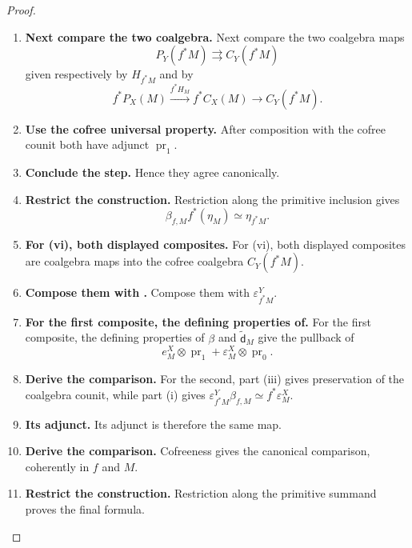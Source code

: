 \begin{proof}
\begin{enumerate}[label=\textup{(\arabic*)}]
    \item \textbf{Next compare the two coalgebra.}
    Next compare the two coalgebra maps
    \[
        P_Y(f^*M)\rightrightarrows C_Y(f^*M)
    \]
    given respectively by \(H_{f^*M}\) and by
    \[
        f^*P_X(M)\xrightarrow{f^*H_M}f^*C_X(M)
        \longrightarrow C_Y(f^*M).
    \]

    \item \textbf{Use the cofree universal property.}
    After composition with the cofree counit both have adjunct \(\operatorname{pr}_1\).

    \item \textbf{Conclude the step.}
    Hence they agree canonically.

    \item \textbf{Restrict the construction.}
    Restriction along the primitive inclusion gives
    \[
        \beta_{f,M}f^*(\eta_M)\simeq\eta_{f^*M}.
    \]

    \item \textbf{For (vi), both displayed composites.}
    For \textup{(vi)}, both displayed composites are coalgebra maps into the cofree coalgebra
    \(C_Y(f^*M)\).

    \item \textbf{Compose them with .}
    Compose them with \(\varepsilon^Y_{f^*M}\).

    \item \textbf{For the first composite, the defining properties of.}
    For the first composite, the defining properties of \(\beta\) and \(\widetilde{\mathsf d}_M\) give the
    pullback of
    \[
        e^X_M\otimes\operatorname{pr}_1+\varepsilon^X_M\otimes\operatorname{pr}_0.
    \]

    \item \textbf{Derive the comparison.}
    For the second, part \textup{(iii)} gives preservation of the coalgebra counit, while part
    \textup{(i)} gives \(\varepsilon^Y_{f^*M}\beta_{f,M}\simeq f^*\varepsilon^X_M\).

    \item \textbf{Its adjunct.}
    Its adjunct is therefore the same map.

    \item \textbf{Derive the comparison.}
    Cofreeness gives the canonical comparison, coherently in \(f\) and \(M\).

    \item \textbf{Restrict the construction.}
    Restriction along the primitive summand proves the final formula.
\end{enumerate}
\end{proof}

